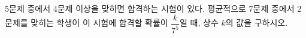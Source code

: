 5문제 중에서 4문제 이상을 맞히면 합격하는 시험이 있다. 평균적으로 7문제 중에서 2문제를 맞히는 학생이 이 시험에 합격할 확률이 $\dfrac{k}{7^5}$일 때, 상수 $k$의 값을 구하시오.
